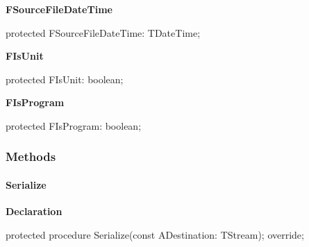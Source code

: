 \documentclass{report}
\newif\ifpdf
\begin{document}
\begin{list}{}
\begin{flushleft}
\ifpdf
\end{flushleft}
\fi


\par  \label{PasDoc_Items.TPasUnit-FSourceFileDateTime}
\item[\textbf{FSourceFileDateTime}\hfill]
\ifpdf
\begin{flushleft}
\fi
\begin{ttfamily}
protected FSourceFileDateTime: TDateTime;\end{ttfamily}

\ifpdf
\end{flushleft}
\fi


\par  \label{PasDoc_Items.TPasUnit-FIsUnit}
\item[\textbf{FIsUnit}\hfill]
\ifpdf
\begin{flushleft}
\fi
\begin{ttfamily}
protected FIsUnit: boolean;\end{ttfamily}

\ifpdf
\end{flushleft}
\fi


\par  \label{PasDoc_Items.TPasUnit-FIsProgram}
\item[\textbf{FIsProgram}\hfill]
\ifpdf
\begin{flushleft}
\fi
\begin{ttfamily}
protected FIsProgram: boolean;\end{ttfamily}

\ifpdf
\end{flushleft}
\fi


\par  \end{list}
\subsubsection*{\large{\textbf{Methods}}\normalsize\hspace{1ex}\hfill}
\paragraph*{Serialize}\hspace*{\fill}

\label{PasDoc_Items.TPasUnit-Serialize}
\begin{list}{}{
\setlength{\itemindent}{0cm}
\setlength{\listparindent}{0cm}
\setlength{\leftmargin}{\evensidemargin}
\addtolength{\leftmargin}{\tmplength}
\settowidth{\labelsep}{X}
\addtolength{\leftmargin}{\labelsep}
\setlength{\labelwidth}{\tmplength}
}
\item[\textbf{Declaration}\hfill]
\ifpdf
\begin{flushleft}
\fi
\begin{ttfamily}
protected procedure Serialize(const ADestination: TStream); override;\end{ttfamily}

\ifpdf
\end{flushleft}
\fi

\end{list}
\end{document}
